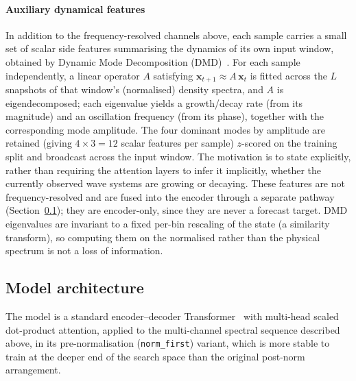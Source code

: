 \paragraph{Auxiliary dynamical features}
In addition to the frequency-resolved channels above, each sample carries a small set of scalar side features summarising the dynamics of its own input window, obtained by Dynamic Mode Decomposition (DMD)~\cite{schmid2010dmd}. For each sample independently, a linear operator $A$ satisfying $\mathbf{x}_{t+1} \approx A\,\mathbf{x}_t$ is fitted across the $L$ snapshots of that window's (normalised) density spectra, and $A$ is eigendecomposed; each eigenvalue yields a growth/decay rate (from its magnitude) and an oscillation frequency (from its phase), together with the corresponding mode amplitude. The four dominant modes by amplitude are retained (giving $4 \times 3 = 12$ scalar features per sample) $z$-scored on the training split and broadcast across the input window. The motivation is to state explicitly, rather than requiring the attention layers to infer it implicitly, whether the currently observed wave systems are growing or decaying. These features are not frequency-resolved and are fused into the encoder through a separate pathway (Section~\ref{sec:architecture}); they are encoder-only, since they are never a forecast target. DMD eigenvalues are invariant to a fixed per-bin rescaling of the state (a similarity transform), so computing them on the normalised rather than the physical spectrum is not a loss of information.

\subsection{Model architecture}
\label{sec:architecture}

The model is a standard encoder--decoder Transformer~\cite{vaswani2017attention} with multi-head scaled dot-product attention, applied to the multi-channel spectral sequence described above, in its pre-normalisation (\texttt{norm\_first}) variant, which is more stable to train at the deeper end of the search space than the original post-norm arrangement.

